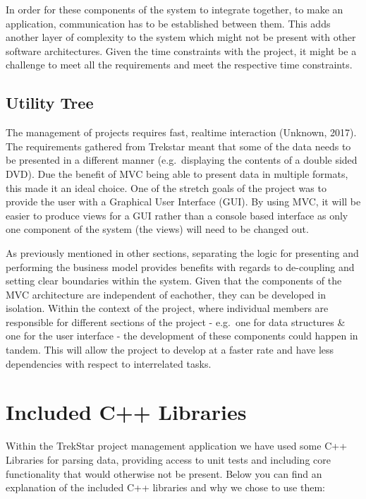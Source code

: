 \documentclass[
  english,
  a4paper,
,tablecaptionabove
]{scrartcl}
\begin{document}
In order for these components of the system to integrate together, to
make an application, communication has to be established between them.
This adds another layer of complexity to the system which might not be
present with other software architectures. Given the time constraints
with the project, it might be a challenge to meet all the requirements
and meet the respective time constraints.

\hypertarget{utility-tree}{%
\subsection{Utility Tree}\label{utility-tree}}

The management of projects requires fast, realtime interaction (Unknown,
2017). The requirements gathered from Trekstar meant that some of the
data needs to be presented in a different manner (e.g.~displaying the
contents of a double sided DVD). Due the benefit of MVC being able to
present data in multiple formats, this made it an ideal choice. One of
the stretch goals of the project was to provide the user with a
Graphical User Interface (GUI). By using MVC, it will be easier to
produce views for a GUI rather than a console based interface as only
one component of the system (the views) will need to be changed out.

As previously mentioned in other sections, separating the logic for
presenting and performing the business model provides benefits with
regards to de-coupling and setting clear boundaries within the system.
Given that the components of the MVC architecture are independent of
eachother, they can be developed in isolation. Within the context of the
project, where individual members are responsible for different sections
of the project - e.g.~one for data structures \& one for the user
interface - the development of these components could happen in tandem.
This will allow the project to develop at a faster rate and have less
dependencies with respect to interrelated tasks.

\newpage

\hypertarget{included-c-libraries}{%
\section{Included C++ Libraries}\label{included-c-libraries}}

Within the TrekStar project management application we have used some C++
Libraries for parsing data, providing access to unit tests and including
core functionality that would otherwise not be present. Below you can
find an explanation of the included C++ libraries and why we chose to
use them:
\end{document}
